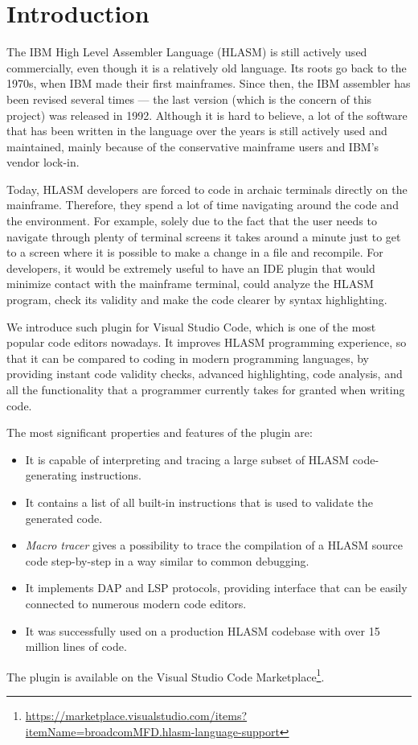 \chapter{Introduction}

The IBM High Level Assembler Language (HLASM) is still actively used commercially, even though it is a relatively old language. Its roots go back to the 1970s, when IBM made their first mainframes. Since then, the IBM assembler has been revised several times --- the last version (which is the concern of this project) was released in 1992. Although it is hard to believe, a lot of the software that has been written in the language over the years is still actively used and maintained, mainly because of the conservative mainframe users and IBM's vendor lock-in.

Today, HLASM developers are forced to code in archaic terminals directly on the mainframe. Therefore, they spend a lot of time navigating around the code and the environment. For example, solely due to the fact that the user needs to navigate through plenty of terminal screens it takes around a minute just to get to a screen where it is possible to make a change in a file and recompile. For developers, it would be extremely useful to have an IDE plugin that would minimize contact with the mainframe terminal, could analyze the HLASM program, check its validity and make the code clearer by syntax highlighting. 

We introduce such plugin for Visual Studio Code, which is one of the most popular code editors nowadays. It improves HLASM programming experience, so that it can be compared to coding in modern programming languages, by providing instant code validity checks, advanced highlighting, code analysis, and all the functionality that a programmer currently takes for granted when writing code.

The most significant properties and features of the plugin are:
\begin{itemize}
	\item It is capable of interpreting and tracing a large subset of HLASM code-generating instructions.
	\item It contains a list of all built-in instructions that is used to validate the generated code.
	\item \emph{Macro tracer} gives a possibility to trace the compilation of a HLASM source code step-by-step in a way similar to common debugging.
	\item It implements DAP and LSP protocols, providing interface that can be easily connected to numerous modern code editors.
	\item It was successfully used on a production HLASM codebase with over 15 million lines of code.
\end{itemize}
The plugin is available on the Visual Studio Code Marketplace\footnote{\url{https://marketplace.visualstudio.com/items?itemName=broadcomMFD.hlasm-language-support}}.

